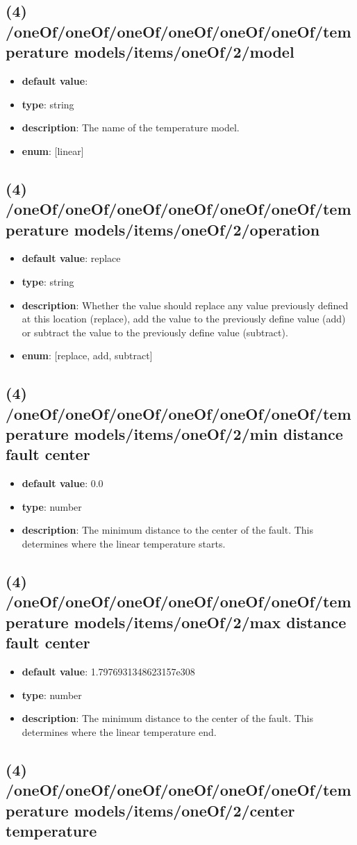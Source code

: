 \subsection{(4) /oneOf/oneOf/oneOf/oneOf/oneOf/oneOf/temperature models/items/oneOf/2/model}
\begin{itemize}[leftmargin=4em]\item {\bf default value}: 
\item {\bf type}: string
\item {\bf description}: The name of the temperature model.
\item {\bf enum}: [linear]\end{itemize}\subsection{(4) /oneOf/oneOf/oneOf/oneOf/oneOf/oneOf/temperature models/items/oneOf/2/operation}
\begin{itemize}[leftmargin=4em]\item {\bf default value}: replace
\item {\bf type}: string
\item {\bf description}: Whether the value should replace any value previously defined at this location (replace), add the value to the previously define value (add) or subtract the value to the previously define value (subtract).
\item {\bf enum}: [replace, add, subtract]\end{itemize}\subsection{(4) /oneOf/oneOf/oneOf/oneOf/oneOf/oneOf/temperature models/items/oneOf/2/min distance fault center}
\begin{itemize}[leftmargin=4em]\item {\bf default value}: 0.0
\item {\bf type}: number
\item {\bf description}: The minimum distance to the center of the fault. This determines where the linear temperature starts.
\end{itemize}\subsection{(4) /oneOf/oneOf/oneOf/oneOf/oneOf/oneOf/temperature models/items/oneOf/2/max distance fault center}
\begin{itemize}[leftmargin=4em]\item {\bf default value}: 1.7976931348623157e308
\item {\bf type}: number
\item {\bf description}: The minimum distance to the center of the fault. This determines where the linear temperature end.
\end{itemize}\subsection{(4) /oneOf/oneOf/oneOf/oneOf/oneOf/oneOf/temperature models/items/oneOf/2/center temperature}
